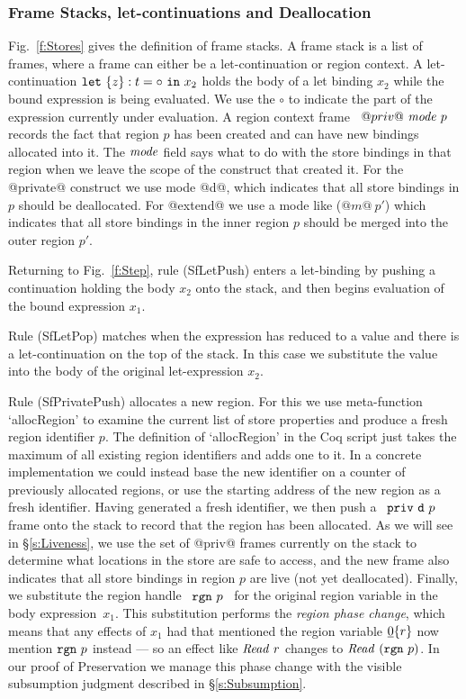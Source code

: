 \subsubsection{Frame Stacks, let-continuations and Deallocation}
\label{s:Steps-Deallocation}
Fig.~\ref{f:Stores} gives the definition of frame stacks. A frame stack is a list of frames, where a frame can either be a let-continuation or region context. A let-continuation \mbox{$\texttt{let}~ \{z\} : t = \circ~ \texttt{in}~ x_2$} holds the body of a let binding $x_2$ while the bound expression is being evaluated. We use the $\circ$ to indicate the part of the expression currently under evaluation. A region context frame ~$@priv@~ \mathit{mode}~ p$~ records the fact that region $p$ has been created and can have new bindings allocated into it. The $\mathit{mode}$ field says what to do with the store bindings in that region when we leave the scope of the construct that created it. For the @private@ construct we use mode @d@, which indicates that all store bindings in $p$ should be deallocated. For @extend@ we use a mode like ($@m@~ p'$) which indicates that all store bindings in the inner region $p$ should be merged into the outer region $p'$.

Returning to Fig.~\ref{f:Step}, rule (SfLetPush) enters a let-binding by pushing a continuation holding the body $x_2$ onto the stack, and then begins evaluation of the bound expression $x_1$.

Rule (SfLetPop) matches when the expression has reduced to a value and there is a let-continuation on the top of the stack. In this case we substitute the value into the body of the original let-expression $x_2$.




Rule (SfPrivatePush) allocates a new region. For this we use meta-function \mbox{`allocRegion'} to examine the current list of store properties and produce a fresh region identifier $p$. The definition of `allocRegion' in the Coq script just takes the maximum of all existing region identifiers and adds one to it. In a concrete implementation we could instead base the new identifier on a counter of previously allocated regions, or use the starting address of the new region as a fresh identifier. Having generated a fresh identifier, we then push a ~$\texttt{priv}~ \texttt{d}~ p$~ frame onto the stack to record that the region has been allocated. As we will see in \S\ref{s:Liveness}, we use the set of @priv@ frames currently on the stack to determine what locations in the store are safe to access, and the new frame also indicates that all store bindings in region $p$ are live (not yet deallocated). Finally, we substitute the region handle ~$\texttt{rgn}~ p$~ for the original region variable in the body expression~$x_1$. This substitution performs the \emph{region phase change}, which means that any effects of $x_1$ had that mentioned the region variable $\underline{0}\{r\}$ now mention $\texttt{rgn}~ p$ instead --- so an effect like $\mathit{Read}~ r$ changes to $\mathit{Read}~ (\texttt{rgn}~ p)$. In our proof of Preservation we manage this phase change with the visible subsumption judgment described in \S\ref{s:Subsumption}.


